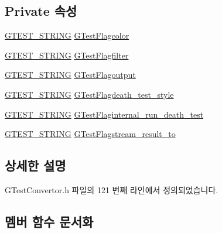 \subsection*{Private 속성}
\begin{DoxyCompactItemize}
\item 
\hyperlink{_g_test_convertor_8h_a41ed98bff00fb37e68f16c7a727f4e3a}{G\+T\+E\+S\+T\+\_\+\+S\+T\+R\+I\+NG} \hyperlink{class_g_test_flags_that_allocate_memory_a6936931985c04bd6689616bcf4549433}{G\+Test\+Flagcolor}
\item 
\hyperlink{_g_test_convertor_8h_a41ed98bff00fb37e68f16c7a727f4e3a}{G\+T\+E\+S\+T\+\_\+\+S\+T\+R\+I\+NG} \hyperlink{class_g_test_flags_that_allocate_memory_a3c9bed3b731643922dc418cec666000f}{G\+Test\+Flagfilter}
\item 
\hyperlink{_g_test_convertor_8h_a41ed98bff00fb37e68f16c7a727f4e3a}{G\+T\+E\+S\+T\+\_\+\+S\+T\+R\+I\+NG} \hyperlink{class_g_test_flags_that_allocate_memory_a03e7c21c555e5aa6c2383102ec93d0f6}{G\+Test\+Flagoutput}
\item 
\hyperlink{_g_test_convertor_8h_a41ed98bff00fb37e68f16c7a727f4e3a}{G\+T\+E\+S\+T\+\_\+\+S\+T\+R\+I\+NG} \hyperlink{class_g_test_flags_that_allocate_memory_a247f73cf721bebea64d826b282a6cbd6}{G\+Test\+Flagdeath\+\_\+test\+\_\+style}
\item 
\hyperlink{_g_test_convertor_8h_a41ed98bff00fb37e68f16c7a727f4e3a}{G\+T\+E\+S\+T\+\_\+\+S\+T\+R\+I\+NG} \hyperlink{class_g_test_flags_that_allocate_memory_a06af81607f38ae4e9a5e579babf15436}{G\+Test\+Flaginternal\+\_\+run\+\_\+death\+\_\+test}
\item 
\hyperlink{_g_test_convertor_8h_a41ed98bff00fb37e68f16c7a727f4e3a}{G\+T\+E\+S\+T\+\_\+\+S\+T\+R\+I\+NG} \hyperlink{class_g_test_flags_that_allocate_memory_a94e2deac970be4b753de2b58d1e38573}{G\+Test\+Flagstream\+\_\+result\+\_\+to}
\end{DoxyCompactItemize}


\subsection{상세한 설명}


G\+Test\+Convertor.\+h 파일의 121 번째 라인에서 정의되었습니다.



\subsection{멤버 함수 문서화}
